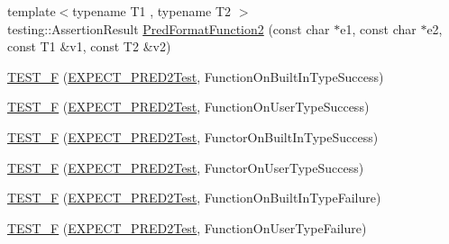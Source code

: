 \begin{DoxyCompactItemize}
\item 
{\footnotesize template$<$typename T1 , typename T2 $>$ }\\testing\+::\+Assertion\+Result \mbox{\hyperlink{googletest-master_2googletest_2test_2gtest__pred__impl__unittest_8cc_ac47f2d44062a47c907d113375ec47d47}{Pred\+Format\+Function2}} (const char $\ast$e1, const char $\ast$e2, const T1 \&v1, const T2 \&v2)
\item 
\mbox{\hyperlink{googletest-master_2googletest_2test_2gtest__pred__impl__unittest_8cc_aba0b6cfb33acecfb0ab3092f2194f958}{T\+E\+S\+T\+\_\+F}} (\mbox{\hyperlink{googletest-master_2googletest_2test_2gtest__pred__impl__unittest_8cc_a232826190f0ba7ce5dffa1ced1219acc}{E\+X\+P\+E\+C\+T\+\_\+\+P\+R\+E\+D2\+Test}}, Function\+On\+Built\+In\+Type\+Success)
\item 
\mbox{\hyperlink{googletest-master_2googletest_2test_2gtest__pred__impl__unittest_8cc_a6c5a246f545dedba3863fc60fdcec435}{T\+E\+S\+T\+\_\+F}} (\mbox{\hyperlink{googletest-master_2googletest_2test_2gtest__pred__impl__unittest_8cc_a232826190f0ba7ce5dffa1ced1219acc}{E\+X\+P\+E\+C\+T\+\_\+\+P\+R\+E\+D2\+Test}}, Function\+On\+User\+Type\+Success)
\item 
\mbox{\hyperlink{googletest-master_2googletest_2test_2gtest__pred__impl__unittest_8cc_a512e6b394b152d77349f5b884043710c}{T\+E\+S\+T\+\_\+F}} (\mbox{\hyperlink{googletest-master_2googletest_2test_2gtest__pred__impl__unittest_8cc_a232826190f0ba7ce5dffa1ced1219acc}{E\+X\+P\+E\+C\+T\+\_\+\+P\+R\+E\+D2\+Test}}, Functor\+On\+Built\+In\+Type\+Success)
\item 
\mbox{\hyperlink{googletest-master_2googletest_2test_2gtest__pred__impl__unittest_8cc_a4ce1ae190c7b5477db170623d18ea48f}{T\+E\+S\+T\+\_\+F}} (\mbox{\hyperlink{googletest-master_2googletest_2test_2gtest__pred__impl__unittest_8cc_a232826190f0ba7ce5dffa1ced1219acc}{E\+X\+P\+E\+C\+T\+\_\+\+P\+R\+E\+D2\+Test}}, Functor\+On\+User\+Type\+Success)
\item 
\mbox{\hyperlink{googletest-master_2googletest_2test_2gtest__pred__impl__unittest_8cc_ae8492c15e79d2d012460a71eb08483ed}{T\+E\+S\+T\+\_\+F}} (\mbox{\hyperlink{googletest-master_2googletest_2test_2gtest__pred__impl__unittest_8cc_a232826190f0ba7ce5dffa1ced1219acc}{E\+X\+P\+E\+C\+T\+\_\+\+P\+R\+E\+D2\+Test}}, Function\+On\+Built\+In\+Type\+Failure)
\item 
\mbox{\hyperlink{googletest-master_2googletest_2test_2gtest__pred__impl__unittest_8cc_a590341b72b346a170ff6d8c73bf559b8}{T\+E\+S\+T\+\_\+F}} (\mbox{\hyperlink{googletest-master_2googletest_2test_2gtest__pred__impl__unittest_8cc_a232826190f0ba7ce5dffa1ced1219acc}{E\+X\+P\+E\+C\+T\+\_\+\+P\+R\+E\+D2\+Test}}, Function\+On\+User\+Type\+Failure)

\end{DoxyCompactItemize}
